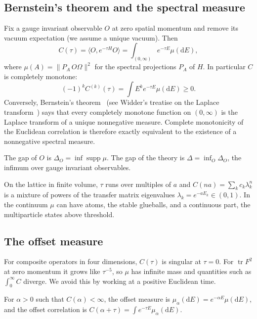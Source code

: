 \subsection{Bernstein's theorem and the spectral measure}\label{sec:bernstein}

Fix a gauge invariant observable $O$ at zero spatial momentum and remove its vacuum expectation (we assume a unique vacuum). Then
\[
C(\tau)=\langle O,e^{-\tau H}O\rangle=\int_{(0,\infty)}e^{-\tau E}\mu(\mathrm dE),
\]
where $\mu(A)=\|P_A\,O\Omega\|^2$ for the spectral projections $P_A$ of $H$. In particular $C$ is completely monotone:
\[
(-1)^kC^{(k)}(\tau)=\int E^ke^{-\tau E}\mu(\mathrm dE)\ge0 .
\]
Conversely, Bernstein's theorem~\cite{Be29} (see Widder's treatise on the Laplace transform~\cite{Wi41}) says that every completely monotone function on $(0,\infty)$ is the Laplace transform of a unique nonnegative measure. Complete monotonicity of the Euclidean correlation is therefore exactly equivalent to the existence of a nonnegative spectral measure.

\begin{definition}
The gap of $O$ is $\Delta_O=\inf\operatorname{supp}\mu$. The gap of the theory is $\Delta=\inf_O\Delta_O$, the infimum over gauge invariant observables.
\end{definition}

On the lattice in finite volume, $\tau$ runs over multiples of $a$ and $C(na)=\sum_kc_k\lambda_k^n$ is a mixture of powers of the transfer matrix eigenvalues $\lambda_k=e^{-aE_k}\in(0,1)$. In the continuum $\mu$ can have atoms, the stable glueballs, and a continuous part, the multiparticle states above threshold.

\subsection{The offset measure}\label{sec:offset}

For composite operators in four dimensions, $C(\tau)$ is singular at $\tau=0$. For $\operatorname{tr}F^2$ at zero momentum it grows like $\tau^{-5}$, so $\mu$ has infinite mass and quantities such as $\int_0^\infty C$ diverge. We avoid this by working at a positive Euclidean time.

\begin{definition}
For $\alpha>0$ such that $C(\alpha)<\infty$, the offset measure is $\mu_\alpha(\mathrm dE)=e^{-\alpha E}\mu(\mathrm dE)$, and the offset correlation is $C(\alpha+\tau)=\int e^{-\tau E}\mu_\alpha(\mathrm dE)$.
\end{definition}

